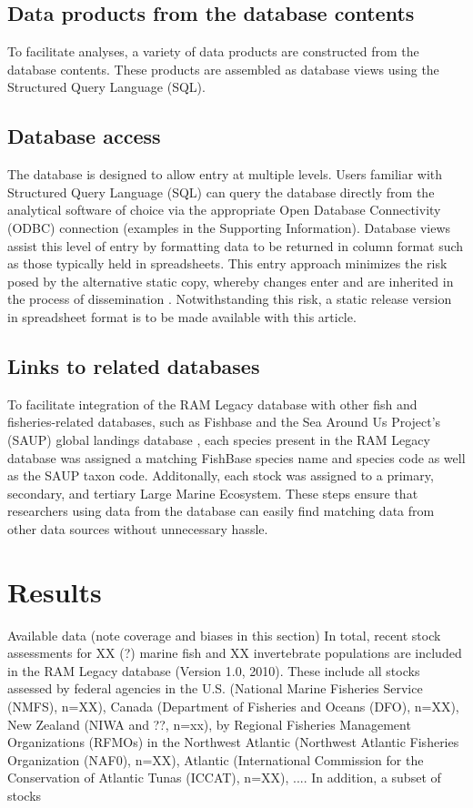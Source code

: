 \documentclass[letterpaper,12pt]{article}
\begin{document}
\subsection{Data products from the database contents}
To facilitate analyses, a variety of data products are constructed
from the database contents. These products are assembled as database
views using the Structured Query Language (SQL).

\subsection{Database access}
The database is designed to allow entry at multiple levels. Users
familiar with Structured Query Language (SQL) can query the database
directly from the analytical software of choice via the appropriate
Open Database Connectivity (ODBC) connection (examples in the
Supporting Information). Database views assist this level of entry by
formatting data to be returned in column format such as those
typically held in spreadsheets. This entry approach minimizes the risk
posed by the alternative static copy, whereby changes enter and are
inherited in the process of dissemination \citep{Barbrook:Howe:Blake:Robinson:1998:nature}.
Notwithstanding this risk, a static release version in spreadsheet
format is to be made available with this article.

\subsection{ Links to related databases}
To facilitate integration of the RAM Legacy database with other fish
and fisheries-related databases, such as Fishbase
\citep{Froese:Pauly:2009:fishbase} and the Sea Around Us Project's
(SAUP) global landings database \citep{Watson:etal:2005:fandf}, each species present in the RAM
Legacy database was assigned a matching FishBase species name and
species code as well as the SAUP taxon code. Additonally, each stock
was assigned to a primary, secondary, and tertiary Large Marine
Ecosystem. These steps ensure that researchers using data from the
database can easily find matching data from other data sources without
unnecessary hassle.

\newpage
\section{Results}

Available data (note coverage and biases in this section) In total,
recent stock assessments for XX (?) marine fish and XX invertebrate
populations are included in the RAM Legacy database (Version 1.0,
2010). These include all stocks assessed by federal agencies in the
U.S. (National Marine Fisheries Service (NMFS), n=XX), Canada
(Department of Fisheries and Oceans (DFO), n=XX), New Zealand (NIWA
and ??, n=xx), by Regional Fisheries Management Organizations (RFMOs)
in the Northwest Atlantic (Northwest Atlantic Fisheries Organization
(NAF0), n=XX), Atlantic (International Commission for the Conservation
of Atlantic Tunas (ICCAT), n=XX), .... In addition, a subset of stocks
\end{document}

